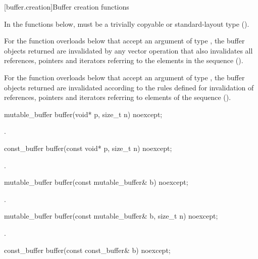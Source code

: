 [buffer.creation]{Buffer creation functions}

\pnum
In the functions below,  must be a trivially copyable or standard-layout type ().

\pnum
For the function overloads below that accept an argument of type , the buffer objects returned are invalidated by any vector operation that also invalidates all references, pointers and iterators referring to the elements in the sequence ().

\pnum
For the function overloads below that accept an argument of type , the buffer objects returned are invalidated according to the rules defined for invalidation of references, pointers and iterators referring to elements of the sequence ().

\begin{itemdecl}
mutable_buffer buffer(void* p, size_t n) noexcept;
\end{itemdecl}

\begin{itemdescr}
\pnum
\returns {}.
\end{itemdescr}

\begin{itemdecl}
const_buffer buffer(const void* p, size_t n) noexcept;
\end{itemdecl}

\begin{itemdescr}
\pnum
\returns {}.
\end{itemdescr}

\begin{itemdecl}
mutable_buffer buffer(const mutable_buffer& b) noexcept;
\end{itemdecl}

\begin{itemdescr}
\pnum
\returns {}.
\end{itemdescr}

\begin{itemdecl}
mutable_buffer buffer(const mutable_buffer& b, size_t n) noexcept;
\end{itemdecl}

\begin{itemdescr}
\pnum
\returns {}.
\end{itemdescr}

\begin{itemdecl}
const_buffer buffer(const const_buffer& b) noexcept;
\end{itemdecl}


